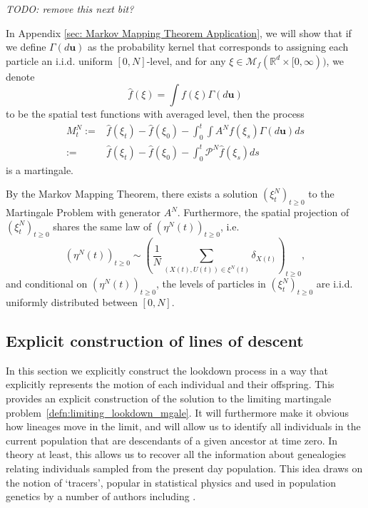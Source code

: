 \documentclass[12pt]{article}
\def \hat{\widehat}
\newcommand{\Pgen}{\mathcal{P}}    %
\newcommand{\lp}{\xi}              %
\newcommand{\comment}[1]{{\color{blue} \it #1}}
\begin{document}
\comment{TODO: remove this next bit?}

In Appendix \ref{sec: Markov Mapping Theorem Application},
we will show that
if we define $\Gamma (d\textbf{u})$
as the probability kernel that corresponds to
assigning each particle an i.i.d. uniform $[0,N]$-level,
and for any $\lp \in \mathcal{M}_f(\mathbb{R}^d \times [0,\infty))$, we denote
$$\hat{f}(\lp)=\int f(\lp) \Gamma (d\textbf{u})$$ 
to be the spatial test functions with averaged level,
then the process
\begin{equation}
\begin{aligned}
M^{N}_t:=&\hat{f}(\lp_t)-\hat{f}(\lp_0)-\int_{0}^{t}\int   A^{N}f(\lp_s)\Gamma(d\textbf{u})ds\\
:=&\hat{f}(\lp_t)-\hat{f}(\lp_0)-\int_{0}^{t}   \Pgen^{N}\hat{f}(\lp_s)ds
\end{aligned}    
\end{equation}
is a martingale.

By the Markov Mapping Theorem,
there exists a solution $(\lp^{N}_t)_{t \geq 0}$
to the Martingale Problem with generator $A^{N}$.
Furthermore,
the spatial projection of $(\lp^{N}_t)_{t \geq 0}$
shares the same law of $(\eta^{N}(t))_{t \geq 0}$,
i.e.
$$(\eta^{N}(t))_{t \geq 0}
\sim \left(\frac{1}{N}\sum\limits_{(X(t),U(t))\in \lp^{N}(t)} \delta_{X(t)}\right)_{t \geq 0},$$
and conditional on 
$(\eta^{N}(t))_{t \geq 0}$,
the levels of particles in $(\lp^{N}_t)_{t \geq 0}$
are i.i.d. uniformly distributed between $[0,N]$.


\subsection{Explicit construction of lines of descent}
    \label{sec: individual lines of descent}

In this section we explicitly construct the lookdown process
in a way that explicitly represents the motion of each individual and their offspring.
This provides an explicit construction of the solution to
the limiting martingale problem~\ref{defn:limiting_lookdown_mgale}.
It will furthermore make it obvious how lineages move in the limit,
and will allow us to identify all 
individuals in the current population that are descendants of a
given ancestor at time zero. In theory at least, this allows us to
recover all the information about genealogies relating individuals 
sampled from the present day population. This idea draws on the notion
of `tracers', popular in statistical physics and used in population
genetics by a number of authors including 
\cite{biswas/etheridge/klimek:2018, durrett/fan:2016, hallatschek/nelson:2008}.
\end{document}
